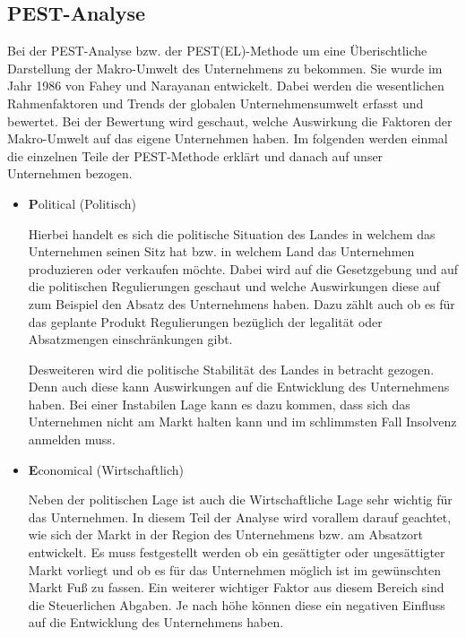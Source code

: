 \subsection{PEST-Analyse} 
    Bei der PEST-Analyse bzw. der PEST(EL)-Methode um eine Überischtliche Darstellung der Makro-Umwelt des Unternehmens
    zu bekommen. Sie wurde im Jahr 1986 von Fahey und Narayanan entwickelt. Dabei werden die wesentlichen Rahmenfaktoren
    und Trends der globalen Unternehmensumwelt erfasst und 
    bewertet. Bei der Bewertung wird geschaut, welche Auswirkung die Faktoren der Makro-Umwelt auf das eigene 
    Unternehmen haben. Im folgenden werden einmal die einzelnen Teile der PEST-Methode erklärt und danach auf unser 
    Unternehmen bezogen.

        \begin{itemize}
            \item \textbf Political (Politisch)

                Hierbei handelt es sich die politische Situation des Landes in welchem das Unternehmen seinen Sitz hat 
                bzw. in welchem Land das Unternehmen produzieren oder verkaufen möchte. Dabei wird auf die Gesetzgebung 
                und auf die politischen Regulierungen geschaut und welche Auswirkungen diese auf zum Beispiel den Absatz
                des Unternehmens haben. Dazu zählt auch ob es für das geplante Produkt Regulierungen bezüglich der 
                legalität oder Absatzmengen einschränkungen gibt.

                Desweiteren wird die politische Stabilität des Landes in betracht gezogen. Denn auch diese kann 
                Auswirkungen auf die Entwicklung des Unternehmens haben. Bei einer Instabilen Lage kann es dazu kommen,
                dass sich das Unternehmen nicht am Markt halten kann und im schlimmsten Fall Insolvenz anmelden muss.

            \item \textbf Economical (Wirtschaftlich)
            
                Neben der politischen Lage ist auch die Wirtschaftliche Lage sehr wichtig für das Unternehmen. In diesem
                Teil der Analyse wird vorallem darauf geachtet, wie sich der Markt in der Region des Unternehmens bzw. 
                am Absatzort entwickelt. Es muss festgestellt werden ob ein gesättigter oder ungesättigter Markt 
                vorliegt und ob es für das Unternehmen möglich ist im gewünschten Markt Fuß zu fassen. Ein weiterer 
                wichtiger Faktor aus diesem Bereich sind die Steuerlichen Abgaben. Je nach höhe können diese ein 
                negativen Einfluss auf die Entwicklung des Unternehmens haben.


\end{itemize}
